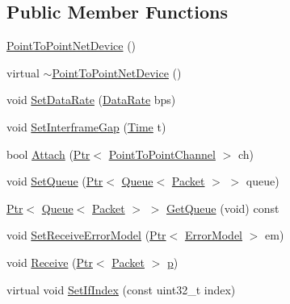 \subsection*{Public Member Functions}
\begin{DoxyCompactItemize}
\item 
\hyperlink{classns3_1_1PointToPointNetDevice_a174d258b6dbfcac4b228ebcab9c49cf5}{Point\+To\+Point\+Net\+Device} ()
\item 
virtual \hyperlink{classns3_1_1PointToPointNetDevice_ad3438bf4937fb164b4affb6d5ec99998}{$\sim$\+Point\+To\+Point\+Net\+Device} ()
\item 
void \hyperlink{classns3_1_1PointToPointNetDevice_adc4e5973337c576a2352e261cd844686}{Set\+Data\+Rate} (\hyperlink{classns3_1_1DataRate}{Data\+Rate} bps)
\item 
void \hyperlink{classns3_1_1PointToPointNetDevice_a7a91527f55cf781d563774d12c1a1723}{Set\+Interframe\+Gap} (\hyperlink{classns3_1_1Time}{Time} t)
\item 
bool \hyperlink{classns3_1_1PointToPointNetDevice_a454670979015d313bd1472114a53af36}{Attach} (\hyperlink{classns3_1_1Ptr}{Ptr}$<$ \hyperlink{classns3_1_1PointToPointChannel}{Point\+To\+Point\+Channel} $>$ ch)
\item 
void \hyperlink{classns3_1_1PointToPointNetDevice_a226b90ac406dd00bd78f0d843c049506}{Set\+Queue} (\hyperlink{classns3_1_1Ptr}{Ptr}$<$ \hyperlink{classns3_1_1Queue}{Queue}$<$ \hyperlink{classns3_1_1Packet}{Packet} $>$ $>$ queue)
\item 
\hyperlink{classns3_1_1Ptr}{Ptr}$<$ \hyperlink{classns3_1_1Queue}{Queue}$<$ \hyperlink{classns3_1_1Packet}{Packet} $>$ $>$ \hyperlink{classns3_1_1PointToPointNetDevice_a80782ff75fb63d68c430c60c5d9bc6df}{Get\+Queue} (void) const 
\item 
void \hyperlink{classns3_1_1PointToPointNetDevice_a5a7244436d1ad225dde5d1414062afc5}{Set\+Receive\+Error\+Model} (\hyperlink{classns3_1_1Ptr}{Ptr}$<$ \hyperlink{classns3_1_1ErrorModel}{Error\+Model} $>$ em)
\item 
void \hyperlink{classns3_1_1PointToPointNetDevice_ac7d662e7083e3a522557fcfa502e4b5e}{Receive} (\hyperlink{classns3_1_1Ptr}{Ptr}$<$ \hyperlink{classns3_1_1Packet}{Packet} $>$ \hyperlink{lte__link__budget__x2__handover__measures_8m_ac9de518908a968428863f829398a4e62}{p})
\item 
virtual void \hyperlink{classns3_1_1PointToPointNetDevice_a83cf6a6591f5b94ee0db4be2823f0f9c}{Set\+If\+Index} (const uint32\+\_\+t index)
\item 

\end{DoxyCompactItemize}
